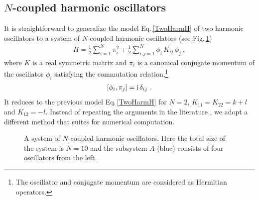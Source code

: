 \subsection{$N$-coupled harmonic oscillators}
It is straightforward to generalize the model Eq.\,\eqref{TwoHarmH} of two harmonic oscillators to a system of $N$-coupled harmonic oscillators (see Fig.\,\ref{fig:HarmChain})
\begin{align}\label{NHarm}
H = \frac{1}{2}\sum_{i=1}^N \pi_i^2 + \frac{1}{2}\sum_{i,j=1}^N \phi_i \,K_{ij}\, \phi_j \ ,
\end{align}
where $K$ is a real symmetric matrix and $\pi_i$ is a canonical conjugate momentum of the oscillator $\phi_i$ satisfying the commutation relation,\footnote{The oscillator and conjugate momentum are considered as Hermitian operators.}
\begin{align}\label{CCR_phi}
	[\phi_i, \pi_j]=\mathrm{i}\,\delta_{ij} \ . 
\end{align}
It reduces to the previous model Eq.\,\eqref{TwoHarmH} for $N=2$, $K_{11}=K_{22} = k+l$ and $K_{12} = -l$.
Instead of repeating the arguments in the literature \cite{Srednicki:1993im,Bombelli:1986rw},
we adopt a different method that suites for numerical computation.

\begin{figure}[htbp]
\centering
{}
\caption{\label{fig:HarmChain} A system of $N$-coupled harmonic oscillators. Here the total size of the system is $N=10$ and the subsystem $A$ (blue) consists of four oscillators from the left.}
\end{figure}


